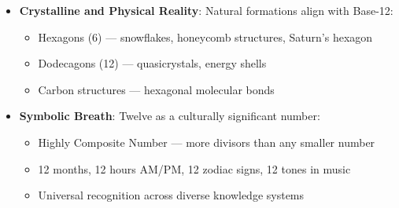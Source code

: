 \begin{itemize}
    \item \texttt{} \textbf{Crystalline and Physical Reality}: Natural formations align with Base-12:
    \begin{itemize}
        \item Hexagons (6) — snowflakes, honeycomb structures, Saturn's hexagon
        \item Dodecagons (12) — quasicrystals, energy shells
        \item Carbon structures — hexagonal molecular bonds
    \end{itemize}
    
    \item \texttt{} \textbf{Symbolic Breath}: Twelve as a culturally significant number:
    \begin{itemize}
        \item Highly Composite Number — more divisors than any smaller number
        \item 12 months, 12 hours AM/PM, 12 zodiac signs, 12 tones in music
        \item Universal recognition across diverse knowledge systems
    \end{itemize}
\end{itemize}

